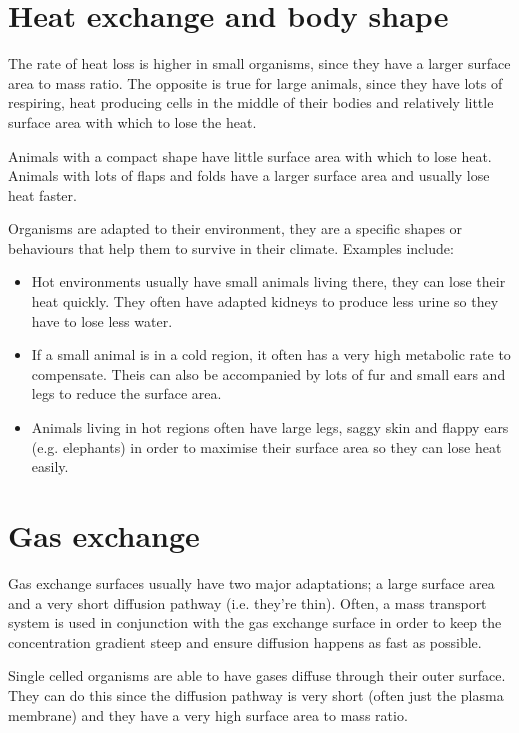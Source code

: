 \documentclass{article}
\begin{document}
\section*{Heat exchange and body shape}

The rate of heat loss is higher in small organisms, since they have a larger
surface area to mass ratio. The opposite is true for large animals, since they
have lots of respiring, heat producing cells in the middle of their bodies and
relatively little surface area with which to lose the heat.

Animals with a compact shape have little surface area with which to lose heat.
Animals with lots of flaps and folds have a larger surface area and usually lose
heat faster.

Organisms are adapted to their environment, they are a specific shapes or
behaviours that help them to survive in their climate. Examples include:

\begin{itemize}

	\item Hot environments usually have small animals living there, they can
	lose their heat quickly. They often have adapted kidneys to produce less
	urine so they have to lose less water.

	\item If a small animal is in a cold region, it often has a very high
	metabolic rate to compensate. Theis can also be accompanied by lots of fur
	and small ears and legs to reduce the surface area.

	\item Animals living in hot regions often have large legs, saggy skin and
	flappy ears (e.g. elephants) in order to maximise their surface area so
	they can lose heat easily.

\end{itemize}

\section*{Gas exchange}

Gas exchange surfaces usually have two major adaptations; a large surface area
and a very short diffusion pathway (i.e. they're thin). Often, a mass transport
system is used in conjunction with the gas exchange surface in order to keep the
concentration gradient steep and ensure diffusion happens as fast as possible.

Single celled organisms are able to have gases diffuse through their outer
surface. They can do this since the diffusion pathway is very short (often just
the plasma membrane) and they have a very high surface area to mass ratio.
\end{document}
